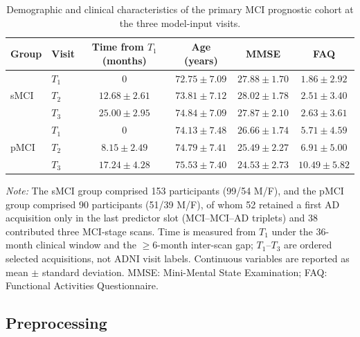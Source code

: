 \documentclass[review]{elsarticle}
\begin{document}
	\begin{table}[htbp]
		\centering
		\footnotesize
		\caption{Demographic and clinical characteristics of the primary MCI prognostic cohort at the three model-input visits.}
		\label{tab:mci_demographics}
		\begin{tabular}{llcccc}
			\toprule
			\textbf{Group} &
			\textbf{Visit} &
			\textbf{Time from $T_1$ (months)} &
			\textbf{Age (years)} &
			\textbf{MMSE} &
			\textbf{FAQ} \\
			\midrule
			\multirow{3}{*}{sMCI}
			& $T_1$ & $0$
			& $72.75 \pm 7.09$ & $27.88 \pm 1.70$ & $1.86 \pm 2.92$ \\
			& $T_2$ & $12.68 \pm 2.61$
			& $73.81 \pm 7.12$ & $28.02 \pm 1.78$ & $2.51 \pm 3.40$ \\
			& $T_3$ & $25.00 \pm 2.95$
			& $74.84 \pm 7.09$ & $27.87 \pm 2.10$ & $2.63 \pm 3.61$ \\
			\midrule
			\multirow{3}{*}{pMCI}
			& $T_1$ & $0$
			& $74.13 \pm 7.48$ & $26.66 \pm 1.74$ & $5.71 \pm 4.59$ \\
			& $T_2$ & $8.15 \pm 2.49$
			& $74.79 \pm 7.41$ & $25.49 \pm 2.27$ & $6.91 \pm 5.00$ \\
			& $T_3$ & $17.24 \pm 4.28$
			& $75.53 \pm 7.40$ & $24.53 \pm 2.73$ & $10.49 \pm 5.82$ \\
			\bottomrule
		\end{tabular}
		\begin{flushleft}
			\footnotesize
			\textit{Note:} The sMCI group comprised 153 participants (99/54 M/F), and the pMCI group comprised 90 participants (51/39 M/F), of whom 52 retained a first AD acquisition only in the last predictor slot (MCI--MCI--AD triplets) and 38 contributed three MCI-stage scans. Time is measured from $T_1$ under the 36-month clinical window and the $\geq6$-month inter-scan gap; $T_1$--$T_3$ are ordered selected acquisitions, not ADNI visit labels. Continuous variables are reported as mean $\pm$ standard deviation. MMSE: Mini-Mental State Examination; FAQ: Functional Activities Questionnaire.
		\end{flushleft}
	\end{table}
	
	\subsection{Preprocessing}
	\label{subsec:Preprocessing}
	
\end{document}
